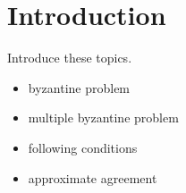 \section{Introduction}
Introduce these topics.
\begin{itemize}
\item byzantine problem
\item multiple byzantine problem
\item following conditions
\item approximate agreement
 
\end{itemize}
\cite{mendes2015multidimensional}
